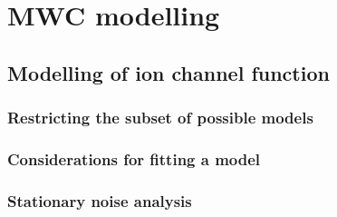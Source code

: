 \chapter{\label{ch:4}MWC modelling} 

\graphicspath{{figures/ch4/}}

\minitoc

\section{Modelling of ion channel function}

\subsection{Restricting the subset of possible models}

\subsection{Considerations for fitting a model}

\subsection{Stationary noise analysis}

